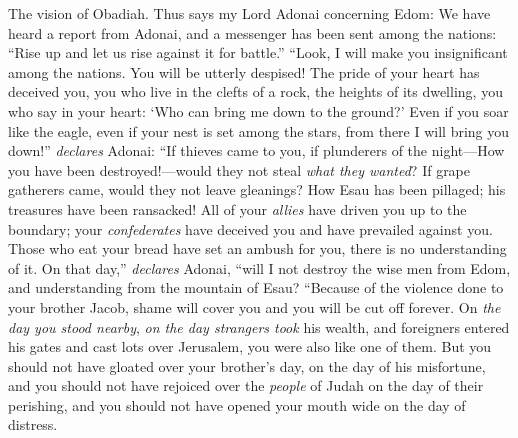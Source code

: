 
\begin{biblechapter} %
 The vision of Obadiah. Thus says my Lord Adonai concerning Edom:
 We have heard a report from Adonai, and a messenger has been sent among the nations: “Rise up and let us rise against it for battle.”
\verse “Look, I will make you insignificant among the nations. You will be utterly despised!
\verse The pride of your heart has deceived you, you who live in the clefts of a rock, the heights of its dwelling, you who say in your heart: ‘Who can bring me down to the ground?’
\verse Even if you soar like the eagle, even if your nest is set among the stars, from there I will bring you down!” \textit{declares} Adonai:
\verse “If thieves came to you, if plunderers of the night—How you have been destroyed!—would they not steal \textit{what they wanted}? If grape gatherers came, would they not leave gleanings?
\verse How Esau has been pillaged; his treasures have been ransacked!
\verse All of your \textit{allies} have driven you up to the boundary; your \textit{confederates} have deceived you and have prevailed against you. Those who eat your bread have set an ambush for you, there is no understanding of it.
\verse On that day,” \textit{declares} Adonai, “will I not destroy the wise men from Edom, and understanding from the mountain of Esau?
 “Because of the violence done to your brother Jacob, shame will cover you and you will be cut off forever.
\verse On \textit{the day you stood nearby}, \textit{on the day strangers took} his wealth, and foreigners entered his gates and cast lots over Jerusalem, you were also like one of them.
\verse But you should not have gloated over your brother’s day, on the day of his misfortune, and you should not have rejoiced over the \textit{people} of Judah on the day of their perishing, and you should not have opened your mouth wide on the day of distress.

\end{biblechapter}
